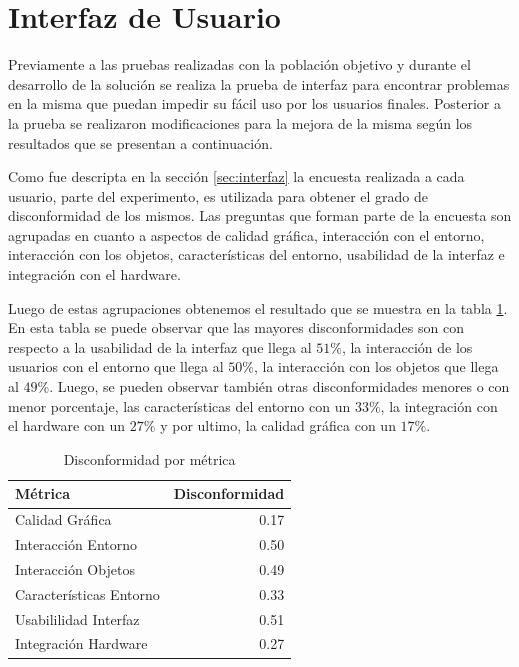 \section{Interfaz de Usuario}
\label{sec:res_INTERFAZ}

Previamente a las pruebas realizadas con la población objetivo y durante el desarrollo de la solución se realiza la prueba de interfaz
para encontrar problemas en la misma que puedan impedir su fácil uso por los usuarios finales. Posterior a la prueba se realizaron modificaciones para la mejora de la misma según los resultados que se presentan a continuación.

Como fue descripta en la sección \ref{sec:interfaz} la encuesta realizada a cada usuario, parte del experimento, es utilizada
para obtener el grado de disconformidad de los mismos. Las preguntas que forman parte de la  encuesta son agrupadas en cuanto a aspectos de calidad gráfica, interacción con el entorno, interacción con los objetos, características del entorno, usabilidad de la interfaz e integración con el hardware.

Luego de estas agrupaciones obtenemos el resultado que se muestra en la tabla \ref{tab:interfaz_disconformidad_metrica}. En esta tabla se puede observar que las mayores disconformidades son con respecto a la usabilidad de la interfaz que llega al $51\%$, la interacción de los usuarios con el entorno que llega al $50\%$, la interacción con los objetos que llega al $49\%$. Luego, se pueden observar también otras disconformidades menores o con menor porcentaje, las características del entorno con un  $33\%$, la integración con el hardware con un  $27\%$ y por ultimo, la calidad gráfica con un  $17\%$.

\begin{table}[!hbt]
\centering
\begin{tabular}{|l|r|}
\hline
\rowcolor{gris} \textbf{Métrica} & \textbf{Disconformidad} \\
\hline
Calidad Gráfica & 0.17 \\
\hline
Interacción Entorno & 0.50\\
\hline
Interacción Objetos & 0.49\\
\hline
Características Entorno & 0.33\\
\hline
Usabililidad Interfaz & 0.51\\
\hline
Integración Hardware & 0.27\\
\hline
\end{tabular}
\caption{Disconformidad por métrica}
\label{tab:interfaz_disconformidad_metrica}
\end{table}


